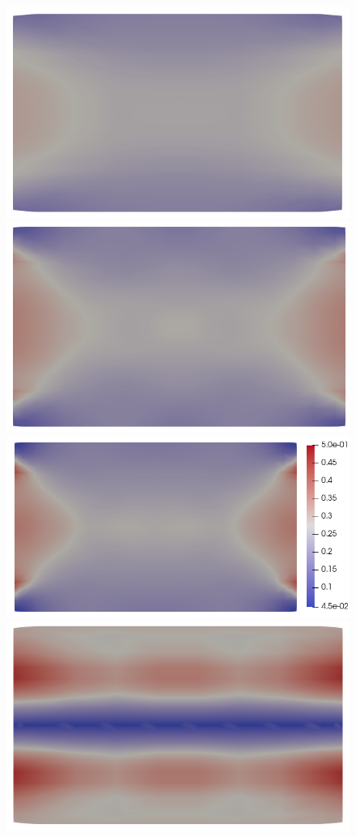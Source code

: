 \documentclass{article}
\begin{document}
\begin{figure}
\begin{minipage}{0.9\textwidth}
    \includegraphics[scale=0.27]{clip_E_T-1_lambda-1e-1_8-2-2.png}
    \includegraphics[scale=0.27]{clip_E_T-1_lambda-1e-1_16-3-3.png}
    \includegraphics[scale=0.27]{clip_E_T-1_lambda-1e-1_32-3-4.png}
    \includegraphics[scale=0.27]{clip_B_T-1_lambda-1e-1_8-2-2.png}

\end{minipage}
\end{figure}
\end{document}
